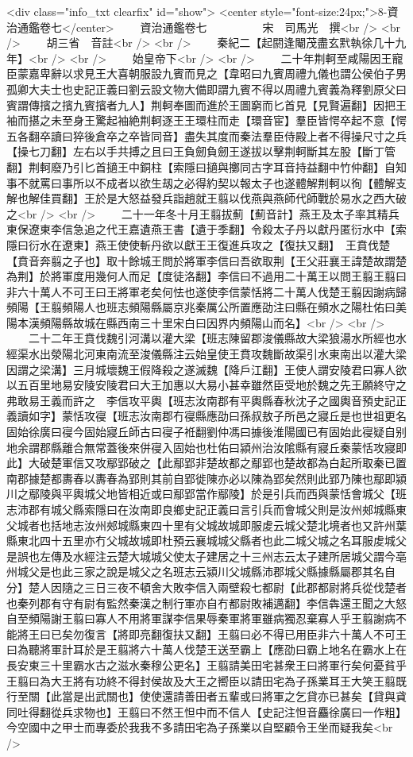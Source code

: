 <div class="info_txt clearfix" id="show">
<center style="font-size:24px;">8-資治通鑑卷七</center>
  　　資治通鑑卷七　　　　　宋　司馬光　撰<br />
<br />
　　胡三省　音註<br />
<br />
　　秦紀二【起閼逢閹茂盡玄黓執徐几十九年】<br />
<br />
　　始皇帝下<br />
<br />
　　二十年荆軻至咸陽因王寵臣蒙嘉卑辭以求見王大喜朝服設九賓而見之【韋昭曰九賓周禮九儀也謂公侯伯子男孤卿大夫士也史記正義曰劉云設文物大備即謂九賓不得以周禮九賓義為釋劉原父曰賓謂傳擯之擯九賓擯者九人】荆軻奉圖而進於王圖窮而匕首見【見賢遍翻】因把王袖而揕之未至身王驚起袖絶荆軻逐王王環柱而走【環音宦】羣臣皆愕卒起不意【愕五各翻卒讀曰猝後倉卒之卒皆同音】盡失其度而秦法羣臣侍殿上者不得操尺寸之兵【操七刀翻】左右以手共搏之且曰王負劒負劒王遂拔以擊荆軻斷其左股【斷丁管翻】荆軻廢乃引匕首擿王中銅柱【索隱曰擿與擲同古字耳音持益翻中竹仲翻】自知事不就罵曰事所以不成者以欲生刼之必得約契以報太子也遂體解荆軻以徇【體解支解也解佳買翻】王於是大怒益發兵詣趙就王翦以伐燕與燕師代師戰於易水之西大破之<br />
<br />
　　二十一年冬十月王翦拔薊【薊音計】燕王及太子率其精兵東保遼東李信急追之代王嘉遺燕王書【遺于季翻】令殺太子丹以獻丹匿衍水中【索隱曰衍水在遼東】燕王使使斬丹欲以獻王王復進兵攻之【復扶又翻】　王賁伐楚【賁音奔翦之子也】取十餘城王問於將軍李信曰吾欲取荆【王父莊襄王諱楚故謂楚為荆】於將軍度用幾何人而足【度徒洛翻】李信曰不過用二十萬王以問王翦王翦曰非六十萬人不可王曰王將軍老矣何怯也遂使李信蒙恬將二十萬人伐楚王翦因謝病歸頻陽【王翦頻陽人也班志頻陽縣屬京兆秦厲公所置應劭注曰縣在頻水之陽杜佑曰美陽本漢頻陽縣故城在縣西南三十里宋白曰因界内頻陽山而名】<br />
<br />
　　二十二年王賁伐魏引河溝以灌大梁【班志陳留郡浚儀縣故大梁狼湯水所經也水經渠水出滎陽北河東南流至浚儀縣注云始皇使王賁攻魏斷故渠引水東南出以灌大梁因謂之梁溝】三月城壞魏王假降殺之遂滅魏【降戶江翻】王使人謂安陵君曰寡人欲以五百里地易安陵安陵君曰大王加惠以大易小甚幸雖然臣受地於魏之先王願終守之弗敢易王義而許之　李信攻平輿【班志汝南郡有平輿縣春秋沈子之國輿音預史記正義讀如字】蒙恬攻寑【班志汝南郡冇寑縣應劭曰孫叔敖子所邑之寢丘是也世祖更名固始徐廣曰寑今固始寢丘師古曰寑子袵翻劉仲馮曰據後淮陽國已有固始此寑疑自别地余謂郡縣離合無常蓋後來併寑入固始也杜佑曰潁州治汝隂縣有寢丘秦蒙恬攻寢即此】大破楚軍信又攻鄢郢破之【此鄢郢非楚故都之鄢郢也楚故都為白起所取秦已置南郡據楚都夀春以夀春為郢則其前自郢徙陳亦必以陳為郢矣然則此郢乃陳也鄢即潁川之鄢陵與平輿城父地皆相近或曰鄢郢當作鄢陵】於是引兵而西與蒙恬會城父【班志沛郡有城父縣索隱曰在汝南即良鄉史記正義曰言引兵而會城父則是汝州郟城縣東父城者也括地志汝州郟城縣東四十里有父城故城即服䖍云城父楚北境者也又許州葉縣東北四十五里亦冇父城故城即杜預云襄城城父縣者也此二城父城之名耳服䖍城父是誤也左傳及水經注云楚大城城父使太子建居之十三州志云太子建所居城父謂今亳州城父是也此三家之說是城父之名班志云潁川父城縣沛郡城父縣據縣屬郡其名自分】楚人因隨之三日三夜不頓舍大敗李信入兩壁殺七都尉【此郡都尉將兵從伐楚者也秦列郡有守有尉有監然秦漢之制行軍亦自冇都尉敗補邁翻】李信犇還王聞之大怒自至頻陽謝王翦曰寡人不用將軍謀李信果辱秦軍將軍雖病獨忍棄寡人乎王翦謝病不能將王曰已矣勿復言【將即亮翻復扶又翻】王翦曰必不得已用臣非六十萬人不可王曰為聽將軍計耳於是王翦將六十萬人伐楚王送至霸上【應劭曰霸上地名在霸水上在長安東三十里霸水古之滋水秦穆公更名】王翦請美田宅甚衆王曰將軍行矣何憂貧乎王翦曰為大王將有功終不得封侯故及大王之嚮臣以請田宅為子孫業耳王大笑王翦既行至關【此當是出武關也】使使還請善田者五輩或曰將軍之乞貸亦已甚矣【貸與貣同吐得翻從兵求物也】王翦曰不然王怛中而不信人【史記注怛音麤徐廣曰一作粗】今空國中之甲士而專委於我我不多請田宅為子孫業以自堅顧令王坐而疑我矣<br />
